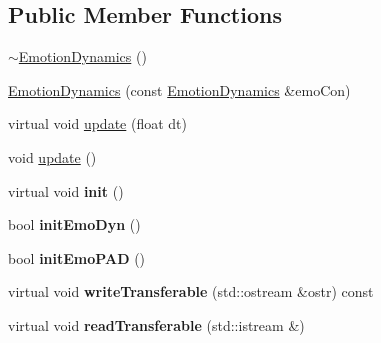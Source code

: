 \subsection*{\-Public \-Member \-Functions}
\begin{DoxyCompactItemize}
\item 
\hyperlink{class_emotion_dynamics_a68538ace62b52fcde2d6bc82279dff2d}{$\sim$\-Emotion\-Dynamics} ()
\item 
\hyperlink{class_emotion_dynamics_a836a77ceb1e0590ec148e6739613e960}{\-Emotion\-Dynamics} (const \hyperlink{class_emotion_dynamics}{\-Emotion\-Dynamics} \&emo\-Con)
\item 
virtual void \hyperlink{class_emotion_dynamics_a806fec22c1590ea3df5037bf3922a7b6}{update} (float dt)
\item 
void \hyperlink{class_emotion_dynamics_afd7e47e31ed473b8f16eca21dab04ded}{update} ()
\item 
\hypertarget{class_emotion_dynamics_a156b80db18d99fac37a07b3602c78d46}{
virtual void {\bfseries init} ()}
\label{class_emotion_dynamics_a156b80db18d99fac37a07b3602c78d46}

\item 
\hypertarget{class_emotion_dynamics_a1b034a59d826ef20bac239557b836714}{
bool {\bfseries init\-Emo\-Dyn} ()}
\label{class_emotion_dynamics_a1b034a59d826ef20bac239557b836714}

\item 
\hypertarget{class_emotion_dynamics_a8b3b6aff43f434945d91b38d1ba24c05}{
bool {\bfseries init\-Emo\-P\-A\-D} ()}
\label{class_emotion_dynamics_a8b3b6aff43f434945d91b38d1ba24c05}

\item 
\hypertarget{class_emotion_dynamics_a862799db63e63af7b97f0a8095fecea9}{
virtual void {\bfseries write\-Transferable} (std\-::ostream \&ostr) const }
\label{class_emotion_dynamics_a862799db63e63af7b97f0a8095fecea9}

\item 
\hypertarget{class_emotion_dynamics_ab5a71869fe76988e63567d8da1ebbb0d}{
virtual void {\bfseries read\-Transferable} (std\-::istream \&)}
\label{class_emotion_dynamics_ab5a71869fe76988e63567d8da1ebbb0d}

\end{DoxyCompactItemize}
